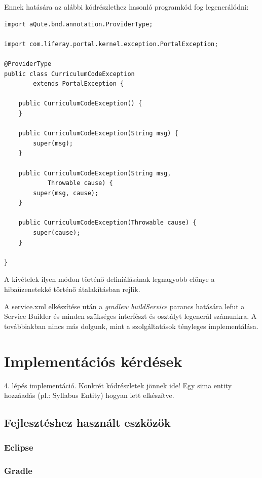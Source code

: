 \documentclass[hidelinks, 12pt, a4paper]{report}
\begin{document}
Ennek hatására az alábbi kódrészlethez hasonló programkód fog legenerálódni:

\begin{minipage}{\linewidth}
\begin{lstlisting}
import aQute.bnd.annotation.ProviderType;

import com.liferay.portal.kernel.exception.PortalException;

@ProviderType
public class CurriculumCodeException
		extends PortalException {

	public CurriculumCodeException() {
	}

	public CurriculumCodeException(String msg) {
		super(msg);
	}

	public CurriculumCodeException(String msg,
			Throwable cause) {
		super(msg, cause);
	}

	public CurriculumCodeException(Throwable cause) {
		super(cause);
	}

}
\end{lstlisting}
\end{minipage}

A kivételek ilyen módon történő definiálásának legnagyobb előnye a hibaüzenetekké történő átalakításban rejlik.


A service.xml elkészítése után a \emph{gradlew buildService} parancs hatására lefut a Service Builder és minden szükséges interfészt és osztályt legenerál számunkra. A továbbiakban nincs más dolgunk, mint a szolgáltatások tényleges implementálása.

\section{Implementációs kérdések}

4. lépés implementáció. Konkrét kódrészletek jönnek ide! Egy sima entity hozzáadás (pl.: Syllabus Entity) hogyan lett elkészítve.

\subsection{Fejlesztéshez használt eszközök}

\subsubsection{Eclipse}

\subsubsection{Gradle}
\end{document}
